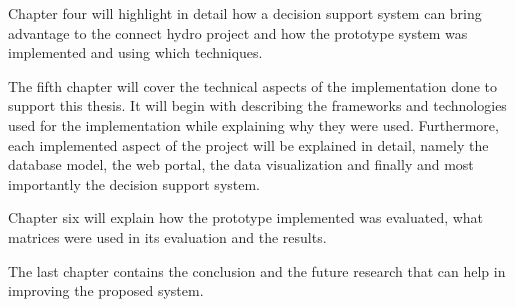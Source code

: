 \indent Chapter four will highlight in detail how a decision support system can bring advantage to the connect hydro project and how the prototype system was implemented and using which techniques.

\indent The fifth chapter will cover the technical aspects of the implementation done to support this thesis. It will begin with describing the frameworks and technologies used for the implementation while explaining why they were used. Furthermore, each implemented aspect of the project will be explained in detail, namely the database model, the web portal, the data visualization and finally and most importantly the decision support system.

\indent Chapter six will explain how the prototype implemented was evaluated, what matrices were used in its evaluation and the results.

\indent The last chapter contains the conclusion and the future research that can help in improving the proposed system.